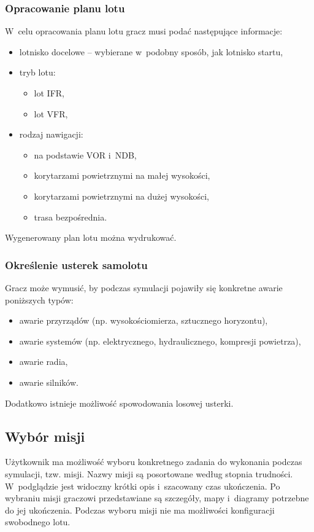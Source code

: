 \documentclass{mwrep}
\begin{document}
\subsubsection{Opracowanie planu lotu}
W~celu opracowania planu lotu gracz musi podać następujące informacje:
\begin{itemize}
\item lotnisko docelowe -- wybierane w~podobny sposób, jak lotnisko startu,
\item tryb lotu:
\begin{itemize}
\item lot IFR,
\item lot VFR,
\end{itemize}
\item rodzaj nawigacji:
\begin{itemize}
\item na podstawie VOR i~NDB,
\item korytarzami powietrznymi na małej wysokości,
\item korytarzami powietrznymi na dużej wysokości,
\item trasa bezpośrednia.
\end{itemize}
\end{itemize}
Wygenerowany plan lotu można wydrukować.

\subsubsection{Określenie usterek samolotu}
Gracz może wymusić, by podczas symulacji pojawiły się konkretne awarie poniższych typów:
\begin{itemize}
\item awarie przyrządów (np. wysokościomierza, sztucznego horyzontu),
\item awarie systemów (np. elektrycznego, hydraulicznego, kompresji powietrza),
\item awarie radia,
\item awarie silników.
\end{itemize}
Dodatkowo istnieje możliwość spowodowania losowej usterki.

\subsection{Wybór misji}

Użytkownik ma możliwość wyboru konkretnego zadania do wykonania podczas symulacji, tzw. misji. Nazwy misji są posortowane według stopnia trudności. W~podglądzie jest widoczny krótki opis i~szacowany czas ukończenia. Po wybraniu misji graczowi przedstawiane są szczegóły, mapy i~diagramy potrzebne do jej ukończenia. Podczas wyboru misji nie ma możliwości konfiguracji swobodnego lotu.
\end{document}
